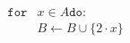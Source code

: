 \documentclass[preview]{standalone}
\begin{document}
\begin{align*}
\mathtt{for} &x \in A \mathtt{do}: \\ &B \leftarrow B \cup \{2 \cdot x\}
\end{align*}
\end{document}
